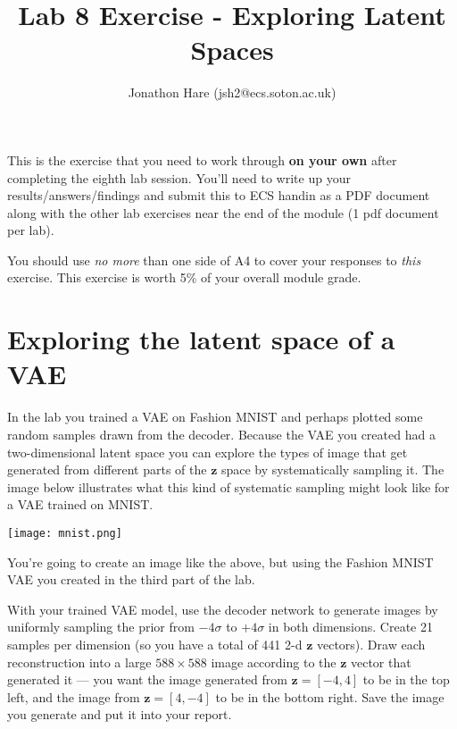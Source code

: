 \documentclass[a4paper]{article}
\begin{document}
\lstset{language=Python,upquote=true}

\setlength{\leftskip}{20pt}
\title{Lab 8 Exercise - Exploring Latent Spaces}
\author{Jonathon Hare (jsh2@ecs.soton.ac.uk)}

\maketitle


This is the exercise that you need to work through \textbf{on your own} after completing the eighth lab session. You'll need to write up your results/answers/findings and submit this to ECS handin as a PDF document along with the other lab exercises near the end of the module (1 pdf document per lab). 

You should use \emph{no more} than one side of A4 to cover your responses to \emph{this} exercise. This exercise is worth 5\% of your overall module grade.

\section{Exploring the latent space of a VAE}\label{vae}
In the lab you trained a VAE on Fashion MNIST and perhaps plotted some random samples drawn from the decoder. Because the VAE you created had a two-dimensional latent space you can explore the types of image that get generated from different parts of the $\bm z$ space by systematically sampling it. The image below illustrates what this kind of systematic sampling might look like for a VAE trained on MNIST.
\begin{center}
	\texttt{[image: mnist.png]}
\end{center}

\begin{tcolorbox}[title=1.1 Systematically sample a VAE (2 marks)]
You're going to create an image like the above, but using the Fashion MNIST VAE you created in the third part of the lab.

With your trained VAE model, use the decoder network to generate images by uniformly sampling the prior from $-4\sigma$ to $+4\sigma$ in both dimensions. Create 21 samples per dimension (so you have a total of 441 2-d $\bm z$ vectors). Draw each reconstruction into a large $588\times588$ image according to the $\bm z$ vector that generated it --- you want the image generated from $\bm z = [-4,4]$ to be in the top left, and the image from $\bm z = [4,-4]$ to be in the bottom right. Save the image you generate and put it into your report.
\end{tcolorbox}
\end{document}
